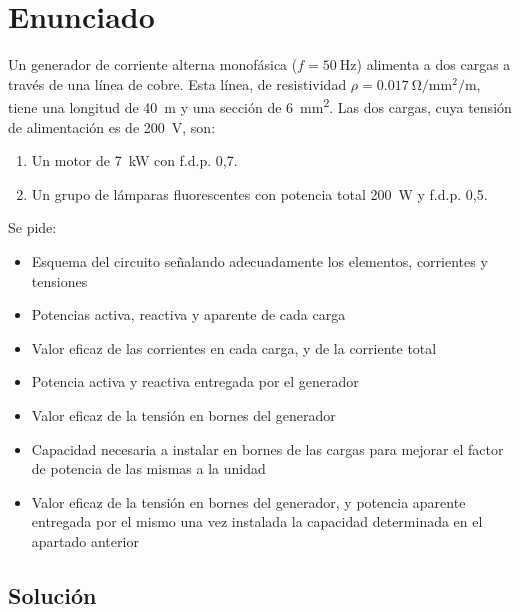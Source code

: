 
\section{Enunciado}
Un generador de corriente alterna monofásica ($f = \qty{50}{\hertz}$) alimenta
a dos cargas a través de una línea de cobre. Esta línea, de
resistividad $\rho = \qty{0.017}{\ohm\per\milli\meter\squared\per\meter}$, tiene una longitud de
\qty{40}{\meter} y una sección de \qty{6}{\milli\meter\squared}. Las dos cargas, cuya tensión de
alimentación es de \qty{200}{\volt}, son:
\begin{enumerate}
\item Un motor de \qty{7}{\kilo\watt} con f.d.p. {0,7}.
\item Un grupo de lámparas fluorescentes con potencia total \qty{200}{\watt} y
  f.d.p. {0,5}.
\end{enumerate}
Se pide:
\begin{itemize}
\item Esquema del circuito señalando adecuadamente los elementos,
  corrientes y tensiones
\item Potencias activa, reactiva y aparente de cada carga
\item Valor eficaz de las corrientes en cada carga, y de la corriente
  total
\item Potencia activa y reactiva entregada por el generador
\item Valor eficaz de la tensión en bornes del generador
\item Capacidad necesaria a instalar en bornes de las cargas para
  mejorar el factor de potencia de las mismas a la unidad
\item Valor eficaz de la tensión en bornes del generador, y potencia
  aparente entregada por el mismo una vez instalada la capacidad
  determinada en el apartado anterior
\end{itemize}

\subsection*{Solución}

